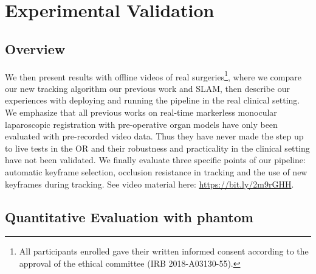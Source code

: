 \section{Experimental Validation}
\label{sec:experiments}
\subsection{Overview}
We then present results with offline videos of real surgeries\footnote{All participants enrolled gave their written informed consent according to the approval of the ethical committee (IRB 2018-A03130-55).}, where we compare our new tracking algorithm \wrt our previous work and SLAM, then describe our experiences with deploying and running the pipeline in the real clinical setting.
We emphasize that all previous works on real-time markerless monocular laparoscopic registration with pre-operative organ models have only been evaluated with pre-recorded video data.
Thus they have never made the step up to live tests in the OR and their robustness and practicality in the clinical setting have not been validated.
We finally evaluate three specific points of our pipeline: automatic keyframe selection, occlusion resistance in tracking and the use of new keyframes during tracking.
See video material here: \url{https://bit.ly/2m9rGHH}.

\subsection{Quantitative Evaluation with phantom}
\label{subsec:quantitative-evaluation-with-phantom}


